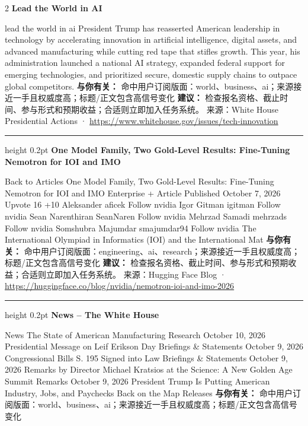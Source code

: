 \documentclass[10.5pt]{ctexart}
\begin{document}
\begin{multicols}{2}
{\large\bfseries Lead the World in AI}\par
lead the world in ai President Trump has reasserted American leadership in technology by accelerating innovation in artificial intelligence, digital assets, and advanced manufacturing while cutting red tape that stifles growth. This year, his administration launched a national AI strategy, expanded federal support for emerging technologies, and prioritized secure, domestic supply chains to outpace global competitors.
\textbf{与你有关：} 命中用户订阅版面：world、business、ai；来源接近一手且权威度高；标题/正文包含高信号变化
\textbf{建议：} 检查报名资格、截止时间、参与形式和预期收益；合适则立即加入任务系统。
{\footnotesize\color{ormuted} 来源：White House Presidential Actions · \url{https://www.whitehouse.gov/issues/tech-innovation}}
\vspace{2mm}
\hrule height 0.2pt
\vspace{2mm}
{\large\bfseries One Model Family, Two Gold-Level Results: Fine-Tuning Nemotron for IOI and IMO}\par
Back to Articles One Model Family, Two Gold-Level Results: Fine-Tuning Nemotron for IOI and IMO Enterprise + Article Published October 7, 2026 Upvote 16 +10 Aleksander aficek Follow nvidia Igor Gitman igitman Follow nvidia Sean Narenthiran SeanNaren Follow nvidia Mehrzad Samadi mehrzads Follow nvidia Somshubra Majumdar smajumdar94 Follow nvidia The International Olympiad in Informatics (IOI) and the International Mat
\textbf{与你有关：} 命中用户订阅版面：engineering、ai、research；来源接近一手且权威度高；标题/正文包含高信号变化
\textbf{建议：} 检查报名资格、截止时间、参与形式和预期收益；合适则立即加入任务系统。
{\footnotesize\color{ormuted} 来源：Hugging Face Blog · \url{https://huggingface.co/blog/nvidia/nemotron-ioi-and-imo-2026}}
\vspace{2mm}
\hrule height 0.2pt
\vspace{2mm}
{\large\bfseries News – The White House}\par
News The State of American Manufacturing Research October 10, 2026 Presidential Message on Leif Erikson Day Briefings \& Statements October 9, 2026 Congressional Bills S. 195 Signed into Law Briefings \& Statements October 9, 2026 Remarks by Director Michael Kratsios at the Science: A New Golden Age Summit Remarks October 9, 2026 President Trump Is Putting American Industry, Jobs, and Paychecks Back on the Map Releases
\textbf{与你有关：} 命中用户订阅版面：world、business、ai；来源接近一手且权威度高；标题/正文包含高信号变化

\end{multicols}
\end{document}
